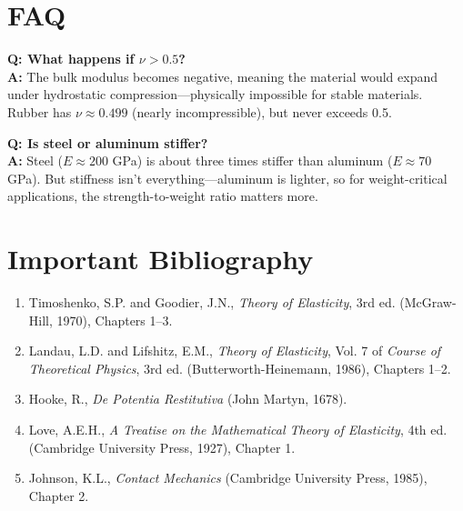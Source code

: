 \section*{FAQ}

\textbf{Q: What happens if $\nu > 0.5$?}\\
\textbf{A:} The bulk modulus becomes negative, meaning the material would expand under hydrostatic compression---physically impossible for stable materials. Rubber has $\nu \approx 0.499$ (nearly incompressible), but never exceeds 0.5.

\textbf{Q: Is steel or aluminum stiffer?}\\
\textbf{A:} Steel ($E \approx 200$ GPa) is about three times stiffer than aluminum ($E \approx 70$ GPa). But stiffness isn't everything---aluminum is lighter, so for weight-critical applications, the strength-to-weight ratio matters more.
\section*{Important Bibliography}

\begin{enumerate}
\item Timoshenko, S.P. and Goodier, J.N., \textit{Theory of Elasticity}, 3rd ed. (McGraw-Hill, 1970), Chapters 1--3.
\item Landau, L.D. and Lifshitz, E.M., \textit{Theory of Elasticity}, Vol. 7 of \textit{Course of Theoretical Physics}, 3rd ed. (Butterworth-Heinemann, 1986), Chapters 1--2.
\item Hooke, R., \textit{De Potentia Restitutiva} (John Martyn, 1678).
\item Love, A.E.H., \textit{A Treatise on the Mathematical Theory of Elasticity}, 4th ed. (Cambridge University Press, 1927), Chapter 1.
\item Johnson, K.L., \textit{Contact Mechanics} (Cambridge University Press, 1985), Chapter 2.
\end{enumerate}

